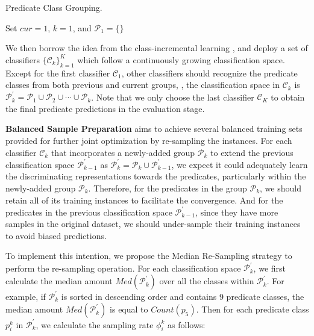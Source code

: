 \documentclass[10pt,twocolumn,letterpaper]{article}
\begin{document}
\begin{algorithm}
	\caption{Predicate Class Grouping.}
	\label{BCD_alg}
	\LinesNumbered
	Set $cur=1$, $k=1$, and $\mathcal{P}_{1} = \{\}$\;
\end{algorithm}


We then borrow the idea from the class-incremental learning \cite{hu2020learning}, and deploy a set of classifiers $ \{\mathcal{C}_{k}\}_{k=1}^{K}$ which follow a continuously growing classification space. Except for the first classifier $ \mathcal{C}_{1}$, other classifiers should recognize the predicate classes from both previous and current groups, \ie, the classification space in $ \mathcal{C}_{k}$ is $ \mathcal{P}_{k}^{\prime}= \mathcal{P}_{1} \cup \mathcal{P}_{2} \cup \cdots \cup \mathcal{P}_{k}$. Note that we only choose the last classifier $ \mathcal{C}_{K}$ to obtain the final predicate predictions in the evaluation stage. 


\textbf{Balanced Sample Preparation} aims to achieve several balanced training sets provided for further joint optimization by re-sampling the instances. For each classifier $\mathcal{C}_{k}$ that incorporates a newly-added group $\mathcal{P}_{k}$ to extend the previous classification space $\mathcal{P}_{k-1}^{\prime}$ as $ \mathcal{P}_{k}^{\prime}=\mathcal{P}_{k} \cup \mathcal{P}_{k-1}^{\prime}$, we expect it could adequately learn the discriminating representations towards the predicates, particularly within the newly-added group $\mathcal{P}_{k}$. Therefore, for the predicates in the group $\mathcal{P}_{k}$, we should retain all of its training instances to facilitate the convergence. And for the predicates in the previous classification space $ \mathcal{P}_{k-1}^{\prime}$, since they have more samples in the original dataset, we should under-sample their training instances to avoid biased predictions.

To implement this intention, we propose the Median Re-Sampling strategy to perform the re-sampling operation. For each classification space $ \mathcal{P}_{k}^{\prime}$, we first calculate the median amount $Med({\mathcal{P}}_{k}^{\prime})$ over all the classes within  $ \mathcal{P}_{k}^{\prime}$. For example, if $\mathcal{P}_{k}^{\prime}$ is sorted in descending order and contains 9 predicate classes, the median amount $Med({\mathcal{P}}_{k}^{\prime})$ is equal to $Count({p}_{5})$. Then for each predicate class $p_{i}^{k}$ in  $ \mathcal{P}_{k}^{\prime}$, we calculate the sampling rate $\phi_{i}^{k}$ as follows:
\end{document}
